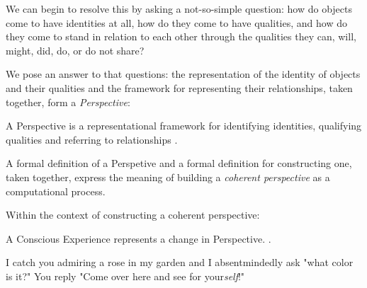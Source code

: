 \documentclass[runningheads]{llncs}
\begin{document}
We can begin to resolve this by asking a not-so-simple question: how do objects come to have identities at all, how do they come to have qualities, and how do they come to stand in relation to each other through the qualities they can, will, might, did, do, or do not share? 

We pose an answer to that questions: the representation of the identity of objects and their qualities and the framework for representing their relationships, taken together, form a \emph{Perspective}:

\setcounter{definition}{1}
\begin{sdefinition}
	A Perspective is a representational framework for identifying identities, qualifying qualities and referring to relationships \cite{Formalism}.
\end{sdefinition}

A formal definition of a Perspetive and a formal definition for constructing one, taken together, express the meaning of building a \emph{coherent perspective} as a computational process.

Within the context of constructing a coherent perspective:

\setcounter{definition}{2}
\begin{assertion}
	A Conscious Experience represents a change in Perspective. \cite{Formalism}.
\end{assertion}

\setcounter{definition}{0}
\begin{cexample}
I catch you admiring a rose in my garden and I absentmindedly ask "what color is it?" You reply "Come over here and see for your\emph{self}!"  
\end{cexample}

\end{document}
